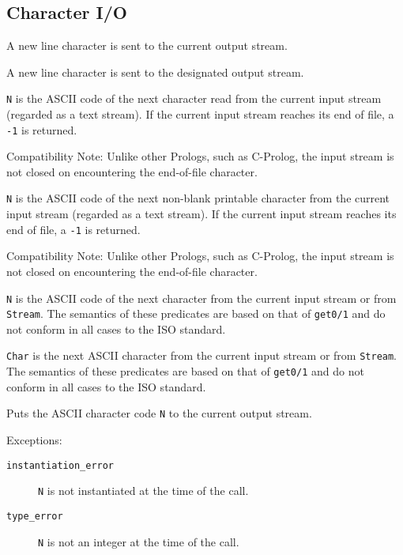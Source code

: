 \subsection{Character I/O}
\begin{description}
    A new line character is sent to the current output stream.

    A new line character is sent to the designated output stream.

    {\tt N} is the ASCII code of the next character read from the
    current input stream (regarded as a text stream). If the current
    input stream reaches its end of file, a {\tt -1} is returned.

    Compatibility Note:  Unlike other Prologs, such as C-Prolog, the input 
    stream is not closed on encountering the end-of-file character.

    {\tt N} is the ASCII code of the next non-blank printable
    character from the current input stream (regarded as a text
    stream).  If the current input stream reaches its end of file, a
    {\tt -1} is returned.

    Compatibility Note:  Unlike other Prologs, such as C-Prolog, the input 
    stream is not closed on encountering the end-of-file character.

\vspace{-7mm} 
   {\tt N} is the ASCII code of the next character from the current
   input stream or from {\tt Stream}.  The semantics of these
   predicates are based on that of {\tt get0/1} and do not conform in
   all cases to the ISO standard.

\vspace{-7mm} 
   {\tt Char} is the next ASCII character from the current input stream
   or from {\tt Stream}.  The semantics of these predicates are based
   on that of {\tt get0/1} and do not conform in all cases to the ISO
   standard.

    Puts the ASCII character code {\tt N} to the current output stream.

    Exceptions:
    \begin{description}
    \item[{\tt instantiation\_error}]
	{\tt N} is not instantiated at the time of the call.
    \item[{\tt type\_error}]
	{\tt N} is not an integer at the time of the call.
    \end{description}


\end{description}
